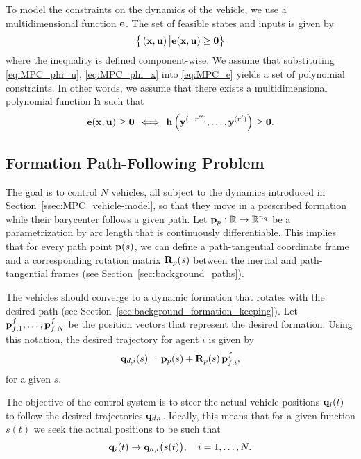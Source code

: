 To model the constraints on the dynamics of the vehicle, we use a multidimensional function $\mathbf{e}$.
The set of feasible states and inputs is given by
\begin{equation}
    \big\{\left(\mathbf{x}, \mathbf{u}\right) \big| \mathbf{e} (\mathbf{x}, \mathbf{u}) \geq \bm{0}\big\}
    \label{eq:MPC_e}
\end{equation}
where the inequality is defined component-wise.
We assume that substituting \eqref{eq:MPC_phi_u}, \eqref{eq:MPC_phi_x} into \eqref{eq:MPC_e} yields a set of polynomial constraints.
In other words, we assume that there exists a multidimensional polynomial function $\mathbf{h}$ such that
\begin{equation}
    \mathbf{e} (\mathbf{x}, \mathbf{u})
    \geq
    \bm{0}
    \, \iff \,
    \mathbf{h} \left( \mathbf{y}^{(-r'')}, \ldots, \mathbf{y}^{(r')} \right)
    \geq
    \bm{0}.
\label{equ:MPC_constraint-h-geq-0}
\end{equation}



\subsection{Formation Path-Following Problem}
\label{ssec:MPC_formation-path-following}



The goal is to control $N$ vehicles, all subject to the dynamics introduced in Section~\ref{ssec:MPC_vehicle-model}, so that they move in a prescribed formation while their barycenter follows a given path.
Let $\mathbf{p}_p : \mathbb{R} \rightarrow \mathbb{R}^{n_{\mathbf{q}}}$ be a parametrization by arc length that is continuously differentiable.
This implies that for every path point $\mathbf{p}(s)$, we can define a path-tangential coordinate frame and a corresponding rotation matrix $\mathbf{R}_p(s)$ between the inertial and path-tangential frames (see Section~\ref{sec:background_paths}).

The vehicles should converge to a dynamic formation that rotates with the desired path (see Section~\ref{sec:background_formation_keeping}).
Let $\mathbf{p}_{f, 1}^f, \ldots, \mathbf{p}_{f, N}^f$ be the position vectors that represent the desired formation.
Using this notation, the desired trajectory for agent $i$ is given by
\begin{equation}
    \mathbf{q}_{d,i}(s) = \mathbf{p}_p(s) + \mathbf{R}_p(s)\, \mathbf{p}_{f, i}^f,
\end{equation} 
for a given $s$.

The objective of the control system is to steer the actual vehicle positions $\mathbf{q}_i(t)$ to follow the desired trajectories $\mathbf{q}_{d,i}$. Ideally, this means that for a given function $s(t)$ we seek the actual positions to be such that
\begin{equation}
    \mathbf{q}_i(t)
    \rightarrow
    \mathbf{q}_{d,i}\big(s(t)\big),
    \quad i = 1, \ldots, N.
    \label{eq:MPC_path_goal}
\end{equation} 

